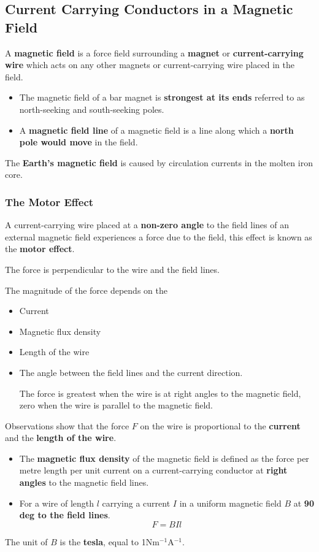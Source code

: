 \subsection{Current Carrying Conductors in a Magnetic Field}

A \textbf{magnetic field} is a force field surrounding a \textbf{magnet} or \textbf{current-carrying wire} which acts on any other magnets or current-carrying wire placed in the field.
\begin{itemize}
    \item The magnetic field of a bar magnet is \textbf{strongest at its ends} referred to as north-seeking and south-seeking poles.
    \item A \textbf{magnetic field line} of a magnetic field is a line along which a \textbf{north pole would move} in the field.
\end{itemize}

The \textbf{Earth's magnetic field} is caused by circulation currents in the molten iron core.

\subsubsection*{The Motor Effect}

A current-carrying wire placed at a \textbf{non-zero angle} to the field lines of an external magnetic field experiences a force due to the field, this effect is known as the \textbf{motor effect}.

The force is perpendicular to the wire and the field lines.

The magnitude of the force depends on the
\begin{itemize}
    \item Current
    \item Magnetic flux density
    \item Length of the wire
    \item The angle between the field lines and the current direction.

        The force is greatest when the wire is at right angles to the magnetic field, zero when the wire is parallel to the magnetic field.
\end{itemize}

Observations show that the force $F$ on the wire is proportional to the \textbf{current} and the \textbf{length of the wire}.
\begin{itemize}
    \item The \textbf{magnetic flux density} of the magnetic field is defined as the force per metre length per unit current on a current-carrying conductor at \textbf{right angles} to the magnetic field lines.
    \item For a wire of length $l$ carrying a current $I$ in a uniform magnetic field $B$ at \textbf{90 deg to the field lines}.
        $$F=BIl$$
\end{itemize}
The unit of $B$ is the \textbf{tesla}, equal to 1Nm$^{-1}$A$^{-1}$.

